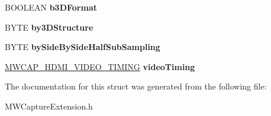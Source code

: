 \begin{DoxyCompactItemize}
\item 
\hypertarget{struct__MWCAP__HDMI__SPECIFIC__STATUS_a133078c591e86cf06e16bfacd2a439e3}{B\-O\-O\-L\-E\-A\-N {\bfseries b3\-D\-Format}}\label{struct__MWCAP__HDMI__SPECIFIC__STATUS_a133078c591e86cf06e16bfacd2a439e3}

\item 
\hypertarget{struct__MWCAP__HDMI__SPECIFIC__STATUS_a50679f7fdaaa80f59d1d41b60f5f1ea3}{B\-Y\-T\-E {\bfseries by3\-D\-Structure}}\label{struct__MWCAP__HDMI__SPECIFIC__STATUS_a50679f7fdaaa80f59d1d41b60f5f1ea3}

\item 
\hypertarget{struct__MWCAP__HDMI__SPECIFIC__STATUS_af73eb8766d20490f1355f6b1a0b94297}{B\-Y\-T\-E {\bfseries by\-Side\-By\-Side\-Half\-Sub\-Sampling}}\label{struct__MWCAP__HDMI__SPECIFIC__STATUS_af73eb8766d20490f1355f6b1a0b94297}

\item 
\hypertarget{struct__MWCAP__HDMI__SPECIFIC__STATUS_a5d3b6995b31cfad31c0559f5cdcaced6}{\hyperlink{struct__MWCAP__HDMI__VIDEO__TIMING}{M\-W\-C\-A\-P\-\_\-\-H\-D\-M\-I\-\_\-\-V\-I\-D\-E\-O\-\_\-\-T\-I\-M\-I\-N\-G} {\bfseries video\-Timing}}\label{struct__MWCAP__HDMI__SPECIFIC__STATUS_a5d3b6995b31cfad31c0559f5cdcaced6}

\end{DoxyCompactItemize}


The documentation for this struct was generated from the following file\-:\begin{DoxyCompactItemize}
\item 
M\-W\-Capture\-Extension.\-h\end{DoxyCompactItemize}
